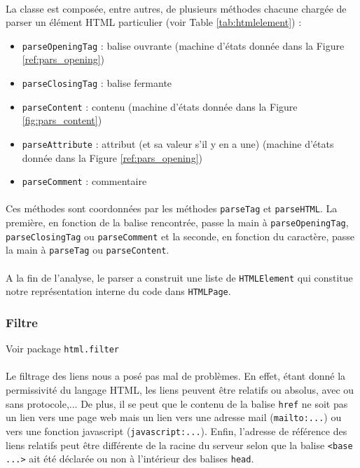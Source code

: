 \documentclass[a4paper,11pt]{article}
\newcommand{\ttseek}[1]{Voir package \texttt{#1}\paragraph{}}
\begin{document}
\paragraph{}
La classe est composée, entre autres, de plusieurs méthodes chacune chargée de parser un élément HTML particulier (voir Table \ref{tab:htmlelement}) :
\begin{itemize}
	\item \texttt{parseOpeningTag} : balise ouvrante (machine d'états donnée dans la Figure \ref{ref:pars_opening})
	\item \texttt{parseClosingTag} : balise fermante
	\item \texttt{parseContent} : contenu (machine d'états donnée dans la Figure \ref{fig:pars_content})
	\item \texttt{parseAttribute} : attribut (et sa valeur s'il y en a une) (machine d'états donnée dans la Figure \ref{ref:pars_opening})
	\item \texttt{parseComment} : commentaire
\end{itemize}
\paragraph{}
Ces méthodes sont coordonnées par les méthodes \texttt{parseTag} et \texttt{parseHTML}. La première, en fonction de la balise rencontrée, passe la main à \texttt{parseOpeningTag}, \texttt{parseClosingTag} ou \texttt{parseComment} et la seconde, en fonction du caractère, passe la main à \texttt{parseTag} ou \texttt{parseContent}.
\paragraph{}
A la fin de l'analyse, le parser a construit une liste de \texttt{HTMLElement} qui constitue notre représentation interne du code dans \texttt{HTMLPage}.
\subsubsection{Filtre}
\ttseek{html.filter}
Le filtrage des liens nous a posé pas mal de problèmes. En effet, étant donné la permissivité du langage HTML, les liens peuvent être relatifs ou absolus, avec ou sans protocole,... De plus, il se peut que le contenu de la balise \texttt{href} ne soit pas un lien vers une page web mais un lien vers une adresse mail (\texttt{mailto:...}) ou vers une fonction javascript (\texttt{javascript:...}). Enfin, l'adresse de référence des liens relatifs peut être différente de la racine du serveur selon que la balise \texttt{<base ...>} ait été déclarée ou non à l'intérieur des balises \texttt{head}. 
\end{document}
